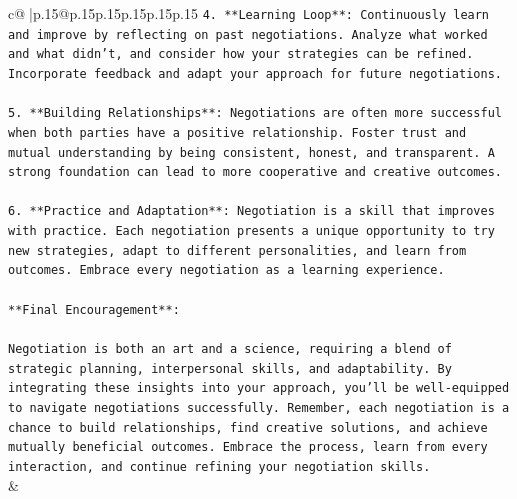 \documentclass{article}
\begin{document}
{\begin{supertabular}{c@{$\;$}|p{.15\linewidth}@{}p{.15\linewidth}p{.15\linewidth}p{.15\linewidth}p{.15\linewidth}p{.15\linewidth}}
{{{\texttt{4. **Learning Loop**: Continuously learn and improve by reflecting on past negotiations. Analyze what worked and what didn't, and consider how your strategies can be refined. Incorporate feedback and adapt your approach for future negotiations.} \\
\\ 
\texttt{5. **Building Relationships**: Negotiations are often more successful when both parties have a positive relationship. Foster trust and mutual understanding by being consistent, honest, and transparent. A strong foundation can lead to more cooperative and creative outcomes.} \\
\\ 
\texttt{6. **Practice and Adaptation**: Negotiation is a skill that improves with practice. Each negotiation presents a unique opportunity to try new strategies, adapt to different personalities, and learn from outcomes. Embrace every negotiation as a learning experience.} \\
\\ 
\texttt{**Final Encouragement**:} \\
\\ 
\texttt{Negotiation is both an art and a science, requiring a blend of strategic planning, interpersonal skills, and adaptability. By integrating these insights into your approach, you'll be well{-}equipped to navigate negotiations successfully. Remember, each negotiation is a chance to build relationships, find creative solutions, and achieve mutually beneficial outcomes. Embrace the process, learn from every interaction, and continue refining your negotiation skills.} \\
            }
        }
    }
    & \\ \\


\end{supertabular}}
\end{document}
